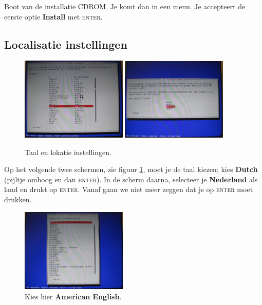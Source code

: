 \documentclass[12pt,a4paper]{article}
\begin{document}
Boot van de installatie CDROM. Je komt dan in een menu.
Je accepteert de eerste optie \textbf{Install} met \textsc{enter}.


\subsection{Localisatie instellingen}
\begin{figure}[H]
\centering
\includegraphics[width=0.45\textwidth]{taal-keuze-scherm}
\includegraphics[width=0.45\textwidth]{lokatie-keuze-scherm}
\caption{Taal en lokatie instellingen.}
\label{fig:taal-keuze-scherm}
\end{figure}

Op het volgende twee schermen, zie figuur \ref{fig:taal-keuze-scherm},  moet je de taal kiezen; kies \textbf{Dutch} (pijltje omhoog en dan \textsc{enter}). In de scherm daarna, selecteer je  \textbf{Nederland} als land en drukt op \textsc{enter}. Vanaf gaan we niet meer zeggen dat je op \textsc{enter} moet drukken.

\begin{figure}[H]
\centering
\includegraphics[width=0.45\textwidth]{toetsenbord-indeling-scherm}
\caption{Kies hier \textbf{American English}.}
\label{fig:toetsenbord-indeling-scherm}
\end{figure}
\end{document}
